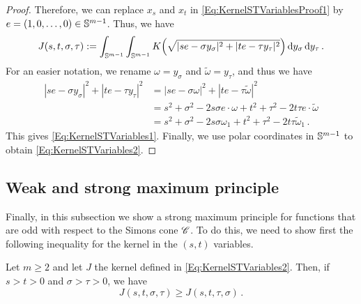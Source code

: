\begin{proof}
Therefore, we can replace $x_s$ and $x_t$ in \eqref{Eq:KernelSTVariablesProof1} by $e =(1,0,\ldots, 0) \in \mathbb{S}^{m-1}$. Thus, we have
\begin{equation}
\label{Eq:KernelSTVariablesProof2}
J(s,t,\sigma, \tau) := \int_{\mathbb{S}^{m-1}}  \int_{\mathbb{S}^{m-1}} K\Big( \sqrt{|s e - \sigma y_\sigma|^2 + |t e - \tau y_\tau|^2 }\Big) \,\mathrm{d} y_\sigma \,\mathrm{d} y_\tau \,.
\end{equation}
For an easier notation, we rename $\omega = y_\sigma$ and $\tilde\omega = y_\tau$, and thus we have
\begin{align*}
|s e - \sigma y_\sigma|^2 + |t e - \tau y_\tau|^2 &= |s e - \sigma \omega|^2 + |t e - \tau \tilde\omega|^2\\
&= s^2 +\sigma^2 - 2 s \sigma e \cdot \omega + t^2 + \tau^2 - 2 t \tau e\cdot \tilde\omega \\
&= s^2 +\sigma^2 - 2 s \sigma \omega_1 + t^2 + \tau^2 - 2t \tau\tilde\omega_1\,.
\end{align*}
This gives \eqref{Eq:KernelSTVariables1}. Finally, we use polar coordinates in $\mathbb{S}^{m-1}$ to obtain \eqref{Eq:KernelSTVariables2}.
\end{proof}





\subsection{Weak and strong maximum principle}



Finally, in this subsection we show a strong maximum principle for functions that are odd with respect to the Simons cone $\mathscr{C}$. To do this, we need to show first the following inequality for the kernel in the $(s,t)$ variables.

\begin{lemma}
\label{Lemma:KernelInequalityCone}
Let $m\geq 2$ and let $J$ the kernel defined in \eqref{Eq:KernelSTVariables2}. Then, if $s>t>0$ and $\sigma > \tau>0$, we have 
\begin{equation}
\label{Eq:KernelInequalityCone}
J(s,t,\sigma, \tau) \geq J(s,t,\tau, \sigma)\,.
\end{equation}
\end{lemma}

